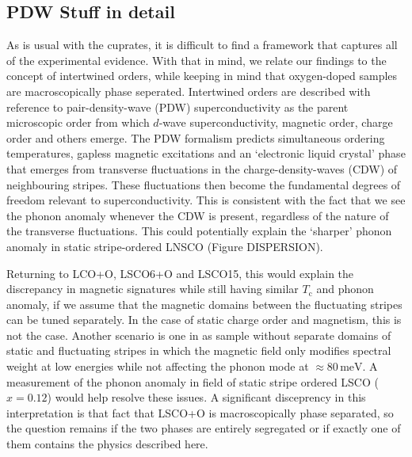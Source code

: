 \subsection{PDW Stuff in detail}
As is usual with the cuprates, it is difficult to find a framework that captures all of the experimental evidence. With that in mind, we relate our findings to the concept of intertwined orders, while keeping in mind that oxygen-doped samples are macroscopically phase seperated. Intertwined orders are described with reference to pair-density-wave (PDW) superconductivity as the parent microscopic order from which $d$-wave superconductivity, magnetic order, charge order and others emerge\cite{Fradkin2015}. The PDW formalism predicts simultaneous ordering temperatures, gapless magnetic excitations\cite{Christensen2016} and an `electronic liquid crystal' phase\cite{Kivelson1998} that emerges from transverse fluctuations in the charge-density-waves (CDW) of neighbouring stripes. These fluctuations then become the fundamental degrees of freedom relevant to superconductivity. This is consistent with the fact that we see the phonon anomaly whenever the CDW is present, regardless of the nature of the transverse fluctuations. This could potentially explain the `sharper' phonon anomaly in static stripe-ordered LNSCO (Figure DISPERSION).

Returning to LCO+O, LSCO6+O and LSCO15, this would explain the discrepancy in magnetic signatures while still having similar $T_\text{c}$ and phonon anomaly, if we assume that the magnetic domains between the fluctuating stripes can be tuned separately. In the case of static charge order and magnetism, this is not the case\cite{Christensen2014}. Another scenario is one in as sample without separate domains of static and fluctuating stripes in which the magnetic field only modifies spectral weight at low energies while not affecting the phonon mode at $\approx 80\,\text{meV}$. A measurement of the phonon anomaly in field of static stripe ordered LSCO ($x=0.12$) would help resolve these issues. A significant disceprency in this interpretation is that fact that LSCO+O is macroscopically phase separated, so the question remains if the two phases are entirely segregated or if exactly one of them contains the physics described here.

